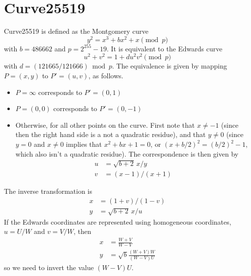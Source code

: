 \documentclass[a4paper]{article}
\begin{document}
\section{Curve25519}

Curve25519 is defined as the Montgomery curve
\begin{equation*}
  y^2 = x^3 + b x^2 + x \pmod p
\end{equation*}
with $b = 486662$ and $p = 2^{255} -19$. It is equivalent to the
Edwards curve
\begin{equation*}
  u^2 + v^2 = 1 + d u^2 v^2 \pmod p
\end{equation*}
with $d = (121665/121666) \bmod p$. The equivalence is given by
mapping $P = (x,y)$ to $P' = (u, v)$, as follows.
\begin{itemize}
\item $P = \infty$ corresponds to $P' = (0, 1)$
\item $P = (0, 0)$ corresponds to $P' = (0, -1)$
\item Otherwise, for all other points on the curve. First note that $x
  \neq -1$ (since then the right hand side is a not a quadratic
  residue), and that $y \neq 0$ (since $y = 0$ and $x \neq 0$ implies
  that $x^2 + bx + 1 = 0$, or $(x + b/2)^2 = (b/2)^2 - 1$, which also
  isn't a quadratic residue). The correspondence is then given by
  \begin{align*}
    u &= \sqrt{b+2} \, x / y \\
    v &= (x-1) / (x+1)
  \end{align*}
\end{itemize}

The inverse transformation is
\begin{align*}
  x &= (1+v) / (1-v) \\
  y &= \sqrt{b+2} \, x / u 
\end{align*}
If the Edwards coordinates are represented using homogeneous
coordinates, $u = U/W$ and $v = V/W$, then
\begin{align*}
  x &= \frac{W+V}{W-V} \\
  y &= \sqrt{b} \frac{(W+V) W}{(W-V) U} 
\end{align*}
so we need to invert the value $(W-V) U$.
\end{document}
